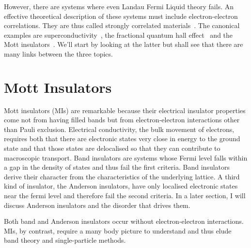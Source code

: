However, there are systems where even Landau Fermi Liquid theory fails. An effective theoretical description of these systems must include electron-electron correlations. They are thus called strongly correlated materials~\autocite{morosanStronglyCorrelatedMaterials2012}. The canonical examples are superconductivity~\autocite{MicroscopicTheorySuperconductivity}, the fractional quantum hall effect~\autocite{feldmanFractionalChargeFractional2021} and the Mott insulators~\autocite{mottBasisElectronTheory1949,fisherMottInsulatorsSpin1999}. We'll start by looking at the latter but shall see that there are many links between the three topics.

\hypertarget{mott-insulators}{%
\section{Mott Insulators}\label{mott-insulators}}

Mott insulators (MIs) are remarkable because their electrical insulator properties come not from having filled bands but from electron-electron interactions other than Pauli exclusion. Electrical conductivity, the bulk movement of electrons, requires both that there are electronic states very close in energy to the ground state and that those states are delocalised so that they can contribute to macroscopic transport. Band insulators are systems whose Fermi level falls within a gap in the density of states and thus fail the first criteria. Band insulators derive their character from the characteristics of the underlying lattice. A third kind of insulator, the Anderson insulators, have only localised electronic states near the fermi level and therefore fail the second criteria. In a later section, I will discuss Anderson insulators and the disorder that drives them.

Both band and Anderson insulators occur without electron-electron interactions. MIs, by contrast, require a many body picture to understand and thus elude band theory and single-particle methods.

